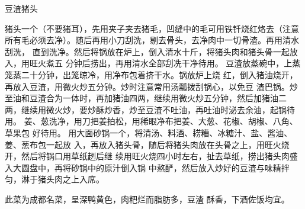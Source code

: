 \begin{recipe}{豆渣猪头}

\ingredients


\preparation

\step 猪头一个（不要猪耳），先用夹子夹去猪毛，凹缝中的毛可用铁钎烧红烙去（注意
所有毛必须去净）。随后再用小刀刮洗，剔去骨头，去净肉中一切骨渣。再用清水刮洗，
直到洗净。然后将锅放在炉上，倒入清水十斤，将猪头肉和猪头骨一起放入，用旺火煮五
分钟后捞出，再用清水全部刮冼干净待用。
\step 豆渣放蒸碗中，上蒸笼蒸二十分钟，出笼晾冷，用净布包着挤干水。锅放炉上烧
红，倒入猪油烧开，再放入豆渣，用微火炒五分钟。炒时注意常用汤瓢拨刮锅心，以免豆
渣巴锅。炒至油和豆渣合为一体时，再加猪油四两，继续用微火炒五分钟，然后加猪油二
两，继续用微火炒，要炒酥炒香，炒至豆渣不吐油，再吐油时泌去余油，起锅待用。
\step 姜、葱洗净，用刀把姜拍松，用稀眼净布把姜、大葱、花椒、胡椒、八角、草果包
好待用。
\step 用大面砂锅一个，将清汤、料酒、耢糟、冰糖汁、盐、酱油、姜、葱布包一起放
入，再放入猪头骨，随后将猪头肉放在头骨之上，用旺火烧开，然后将锅口用草纸趔后继
续用旺火烧四小时左右，扯去草纸，捞出猪头肉盛入大圆盘中，再将砂锅中的原汁倒入锅
中熬酽，然后放入炒好的豆渣与味精拌匀，淋于猪头肉之上入席。

\features

此菜为成都名菜，呈深鸭黄色，肉粑烂而脂肪多，豆渣 酥香，下酒佐饭均宜。

\end{recipe}

